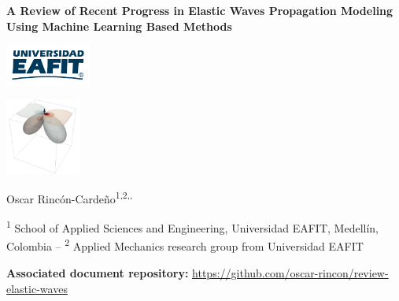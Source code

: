 \documentclass[11pt,twoside]{article}
\begin{document}
\thispagestyle{empty}
\begin{tcolorbox}[colback=white!20,colframe=gray!20,sharp corners]

\vspace{-2mm} 
 


\begin{minipage}{10cm}
        \begin{center}
            \textbf{\large A Review of Recent Progress in Elastic Waves Propagation Modeling Using Machine Learning Based Methods}  
            \end{center}                 
    \end{minipage} 
    \begin{minipage}{3.3cm}
        \begin{center}
            \hspace{-0.2cm}\includegraphics[width=2.8cm]{figs/logo_EAFIT.pdf}
        \end{center}
    \end{minipage}    
    \begin{minipage}{2.2cm}
        \begin{center}
           \includegraphics[width=2.5cm]{figs/logo_grupo.pdf}
        \end{center}
    \end{minipage}
\vspace{-2mm} 
\end{tcolorbox}
\begin{tcolorbox}[colback=white!20,colframe=gray!20,sharp corners]



{\begin{center}
Oscar Rincón-Cardeño\textsuperscript{1,2,,}

\end{center}
}

\vspace{-0.3cm}

{\footnotesize
\textsuperscript{1} School of Applied Sciences and Engineering, Universidad EAFIT, Medellín, Colombia – \textsuperscript{2} Applied Mechanics research group from
Universidad EAFIT
}

{\noindent\footnotesize{\textbf{Associated document repository:} \href{https://github.com/oscar-rincon/review-elastic-waves}{https://github.com/oscar-rincon/review-elastic-waves}}}

\end{tcolorbox}
\end{document}
